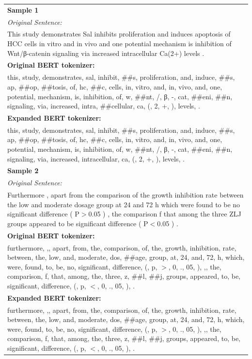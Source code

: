 \documentclass[12pt,letterpaper]{article}
\begin{document}
\scriptsize
\begin{longtable}{|p{}|}
	\hline
	\textbf{Sample 1} \\
	\textit{Original Sentence:} \\
	This study demonstrates Sal inhibits proliferation and induces apoptosis of HCC cells in vitro and in vivo and one potential mechanism is inhibition of Wnt/β-catenin signaling via increased intracellular Ca(2+) levels . \\
	\textbf{Original BERT tokenizer:} \\
	this, study, demonstrates, sal, inhibit, \#\#s, proliferation, and, induce, \#\#s, ap, \#\#op, \#\#tosis, of, hc, \#\#c, cells, in, vitro, and, in, vivo, and, one, potential, mechanism, is, inhibition, of, w, \#\#nt, /, β, -, cat, \#\#eni, \#\#n, signaling, via, increased, intra, \#\#cellular, ca, (, 2, +, ), levels, . \\
	\textbf{Expanded BERT tokenizer:} \\
	this, study, demonstrates, sal, inhibit, \#\#s, proliferation, and, induce, \#\#s, ap, \#\#op, \#\#tosis, of, hc, \#\#c, cells, in, vitro, and, in, vivo, and, one, potential, mechanism, is, inhibition, of, w, \#\#nt, /, β, -, cat, \#\#eni, \#\#n, signaling, via, increased, intracellular, ca, (, 2, +, ), levels, . \\
	\hline
	
	\textbf{Sample 2} \\
	\textit{Original Sentence:} \\
	Furthermore , apart from the comparison of the growth inhibition rate between the low and moderate dosage group at 24 and 72 h which were found to be no significant difference ( P$>$0.05 ) , the comparison f that among the three ZLJ groups appeared to be significant difference ( P$<$0.05 ) . \\
	\textbf{Original BERT tokenizer:} \\
	furthermore, ,, apart, from, the, comparison, of, the, growth, inhibition, rate, between, the, low, and, moderate, dos, \#\#age, group, at, 24, and, 72, h, which, were, found, to, be, no, significant, difference, (, p, $>$, 0, ., 05, ), ,, the, comparison, f, that, among, the, three, z, \#\#l, \#\#j, groups, appeared, to, be, significant, difference, (, p, $<$, 0, ., 05, ), . \\
	\textbf{Expanded BERT tokenizer:} \\
	furthermore, ,, apart, from, the, comparison, of, the, growth, inhibition, rate, between, the, low, and, moderate, dos, \#\#age, group, at, 24, and, 72, h, which, were, found, to, be, no, significant, difference, (, p, $>$, 0, ., 05, ), ,, the, comparison, f, that, among, the, three, z, \#\#l, \#\#j, groups, appeared, to, be, significant, difference, (, p, $<$, 0, ., 05, ), . \\
	\hline
	

\end{longtable}
\end{document}
